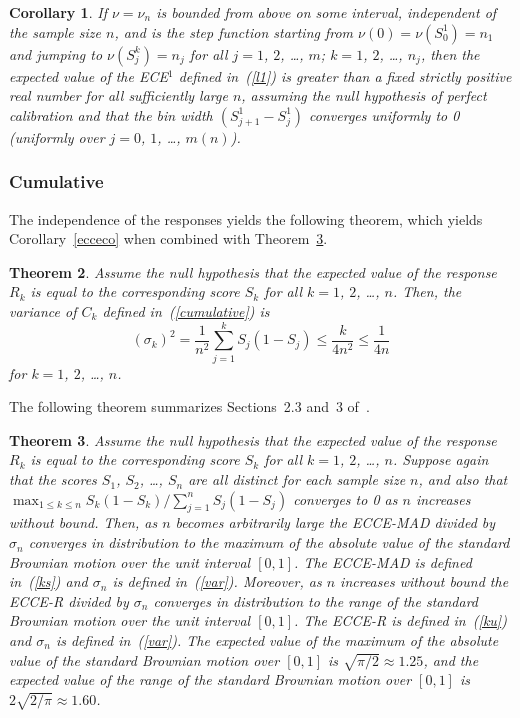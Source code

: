 \documentclass{article}
\newtheorem{theorem}{Theorem}[]
\newtheorem{corollary}[theorem]{Corollary}
\begin{document}
\begin{corollary}
\label{l1co}
If $\nu = \nu_n$ is bounded from above on some interval,
independent of the sample size $n$,
and is the step function starting from $\nu(0) = \nu(S_0^1) = n_1$
and jumping to $\nu(S_j^k) = n_j$
for all $j = 1$, $2$, \dots, $m$; $k = 1$, $2$, \dots, $n_j$,
then the expected value of the ECE$^1$ defined in~(\ref{l1}) is greater
than a fixed strictly positive real number for all sufficiently large $n$,
assuming the null hypothesis of perfect calibration
and that the bin width $(S_{j+1}^1 - S_j^1)$ converges uniformly to 0
(uniformly over $j = 0$, $1$, \dots, $m(n)$).
\end{corollary}

\subsubsection{Cumulative}

The independence of the responses yields the following theorem,
which yields Corollary~\ref{ecceco} when combined with Theorem~\ref{Brownian}.

\begin{theorem}
\label{varthm}
Assume the null hypothesis that the expected value of the response $R_k$ is
equal to the corresponding score $S_k$ for all $k = 1$, $2$, \dots, $n$.
Then, the variance of $C_k$ defined in~(\ref{cumulative}) is
%
\begin{equation}
\label{var}
(\sigma_k)^2 = \frac{1}{n^2} \sum_{j=1}^k S_j (1 - S_j) \le \frac{k}{4n^2}
\le \frac{1}{4n}
\end{equation}
%
for $k = 1$, $2$, \dots, $n$.
\end{theorem}

The following theorem summarizes Sections~2.3 and~3 of~\cite{tygert_pvals}.

\begin{theorem}
\label{Brownian}
Assume the null hypothesis that the expected value of the response $R_k$ is
equal to the corresponding score $S_k$ for all $k = 1$, $2$, \dots, $n$.
Suppose again that the scores $S_1$, $S_2$, \dots, $S_n$ are all distinct
for each sample size $n$, and also that
$\max_{1 \le k \le n} S_k (1 - S_k) / \sum_{j=1}^n S_j (1 - S_j)$
converges to 0 as $n$ increases without bound.
Then, as $n$ becomes arbitrarily large the ECCE-MAD divided by $\sigma_n$
converges in distribution to the maximum of the absolute value
of the standard Brownian motion over the unit interval $[0, 1]$.
The ECCE-MAD is defined in~(\ref{ks}) and $\sigma_n$ is defined in~(\ref{var}).
Moreover, as $n$ increases without bound the ECCE-R divided by $\sigma_n$
converges in distribution to the range of the standard Brownian motion
over the unit interval $[0, 1]$.
The ECCE-R is defined in~(\ref{ku}) and $\sigma_n$ is defined in~(\ref{var}).
The expected value of the maximum of the absolute value
of the standard Brownian motion over $[0, 1]$ is $\sqrt{\pi/2} \approx 1.25$,
and the expected value of the range of the standard Brownian motion
over $[0, 1]$ is $2 \sqrt{2 / \pi} \approx 1.60$.
\end{theorem}
\end{document}
